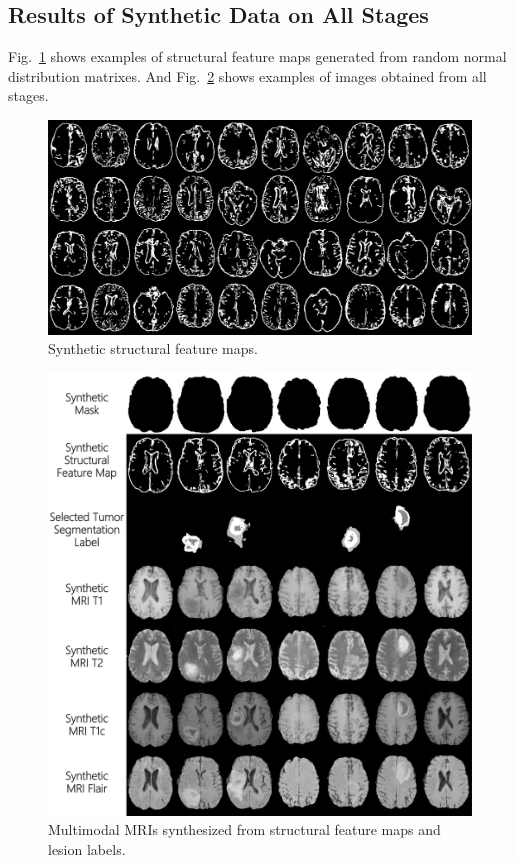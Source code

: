 \documentclass{ecai}
\begin{document}
\subsection{Results of Synthetic Data on All Stages}
Fig.~\ref{generated_f} shows examples of structural feature maps generated from random normal distribution matrixes. And Fig.~\ref{generated_mri} shows examples of images obtained from all stages.
\begin{figure}
	\centering
	\includegraphics[width=0.95\linewidth]{figures/Fs}
	\caption{Synthetic structural feature maps.}
	\label{generated_f}
\end{figure}
\begin{figure}
	\centering
	\includegraphics[width=0.98\linewidth]{figures/F_to_MRI}
	\caption{Multimodal MRIs synthesized from structural feature maps and lesion labels.}
	\label{generated_mri}
\end{figure}
\end{document}
